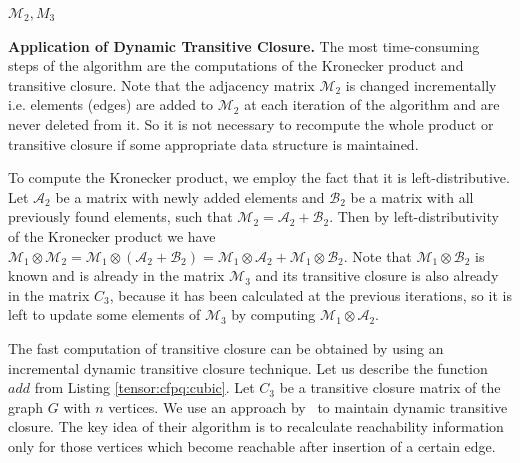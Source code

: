 \begin{algorithm}[h]
\begin{algorithmic}[1]
                \EndFor
        \EndFor
    \EndWhile
\State \Return $\mathcal{M}_2, M_3$
\EndFunction
{}
    \State {}
\EndFunction
{}
    \State {}
\EndFunction
\end{algorithmic}
\end{algorithm}

\textbf{Application of Dynamic Transitive Closure.}
The most time-consuming steps of the algorithm are the computations of the Kronecker product and transitive closure.
Note that the adjacency matrix $\mathcal{M}_2$ is changed incrementally i.e. elements (edges) are added to $\mathcal{M}_2$ at each iteration of the algorithm and are never deleted from it.
So it is not necessary to recompute the whole product or transitive closure if some appropriate data structure is maintained.

To compute the Kronecker product, we employ the fact that it is left-distributive.
Let $\mathcal{A}_2$ be a matrix with newly added elements and $\mathcal{B}_2$ be a matrix with all previously found elements, such that $\mathcal{M}_2 = \mathcal{A}_2 + \mathcal{B}_2$.
Then by left-distributivity of the Kronecker product we have $\mathcal{M}_1 \otimes \mathcal{M}_2 = \mathcal{M}_1 \otimes (\mathcal{A}_2 + \mathcal{B}_2) = \mathcal{M}_1\otimes \mathcal{A}_2 + \mathcal{M}_1 \otimes \mathcal{B}_2$.
Note that $\mathcal{M}_1 \otimes \mathcal{B}_2$ is known and is already in the matrix $\mathcal{M}_3$ and its transitive closure is also already in the matrix $C_3$, because it has been calculated at the previous iterations, so it is left to update some elements of $\mathcal{M}_3$ by computing $\mathcal{M}_1\otimes \mathcal{A}_2$.


The fast computation of transitive closure can be obtained by using an incremental dynamic transitive closure technique.
Let us describe the function $add$ from Listing \ref{tensor:cfpq:cubic}.
Let $C_3$ be a transitive closure matrix of the graph $G$ with $n$ vertices.
We use an approach by~\cite{IBARAKI198395} to maintain dynamic transitive closure.
The key idea of their algorithm is to recalculate reachability information only for those vertices which become reachable after insertion of a certain edge.

